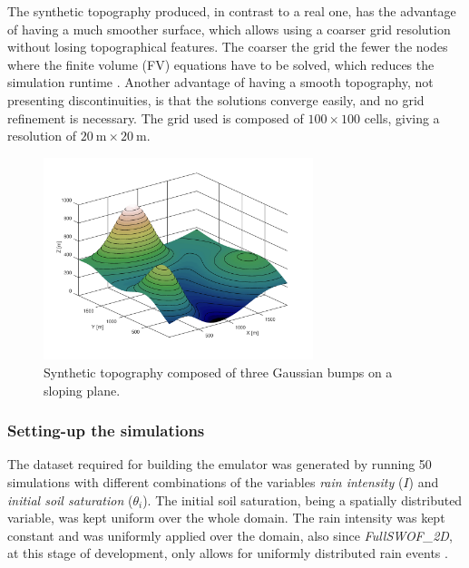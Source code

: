 The synthetic topography produced, in contrast to a real one, has the advantage of having a much smoother surface, which allows using a coarser grid resolution without losing topographical features.
The coarser the grid the fewer the nodes where the finite volume (FV) equations have to be solved, which reduces the simulation runtime . 
Another advantage of having a smooth topography, not presenting discontinuities, is that the solutions converge easily, and no grid refinement is necessary.
The grid used is composed of $\num{100} \times \num{100}$ cells, giving a resolution of $\SI{20}{\meter} \times \SI{20}{\meter}.$

\begin{figure}[h]
  \centering
  \includegraphics[width=0.7\textwidth]{Figures/topography.png}
  \caption{Synthetic topography composed of three Gaussian bumps on a sloping plane.}
  \label{fig:topography}
\end{figure}

\subsubsection{Setting-up the simulations}
The dataset required for building the emulator was generated by running \num{50} simulations with different combinations of the variables \emph{rain intensity} ($I$) and \emph{initial soil saturation} ($\theta_i$).
The initial soil saturation, being a spatially distributed variable, was kept uniform over the whole domain.
The rain intensity was kept constant and was uniformly applied over the domain, also since \textit{FullSWOF\_2D}, at this stage of development, only allows for uniformly distributed rain events \autocite{laguerre_documentation_2016}.

